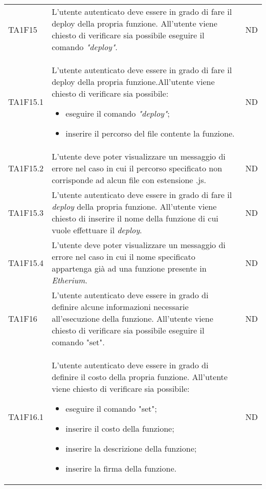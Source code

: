 \begin{longtable}{|C{1.5cm}|C{10cm}|C{1.5cm}|}
	TA1F15  &
	L'utente autenticato deve essere in grado di fare il deploy della propria funzione.
	All’utente viene chiesto di verificare sia possibile eseguire il comando \textit{"deploy\glos"}. &
	ND \\

	TA1F15.1  &
	L'utente autenticato deve essere in grado di fare il deploy della propria funzione.All’utente viene chiesto di verificare sia possibile:
	\begin{itemize}
		\item eseguire il comando \textit{"deploy"\glos};
		\item inserire il percorso del file contente la funzione.
	\end{itemize} &
	ND \\[-5ex]

	TA1F15.2  &
	L’utente deve poter visualizzare un messaggio di errore nel caso in cui il percorso specificato non corrisponde ad alcun file con estensione .js. &
	ND \\

	TA1F15.3  &
	L'utente autenticato deve essere in grado di fare il \textit{deploy\glo} della propria funzione. All’utente viene chiesto di inserire il nome della funzione di cui vuole effettuare il \textit{deploy\glos}. &
	ND \\

	TA1F15.4  &
	L’utente deve poter visualizzare un messaggio di errore nel caso in cui il nome specificato appartenga già ad una funzione presente in \textit{Etherium\glo}. &
	ND \\

	TA1F16  &
	L'utente autenticato deve essere in grado di definire alcune informazioni necessarie all'esecuzione della funzione. All’utente viene chiesto di verificare sia possibile eseguire il comando "set". &
	ND \\

	TA1F16.1  &
	L'utente autenticato deve essere in grado di definire il costo della propria funzione. All’utente viene chiesto di verificare sia possibile:
	\begin{itemize}
		\item eseguire il comando "set";
		\item inserire il costo della funzione;
		\item inserire la descrizione della funzione;
		\item inserire la firma della funzione.
	\end{itemize} &
	ND \\[-5ex]


\end{longtable}
